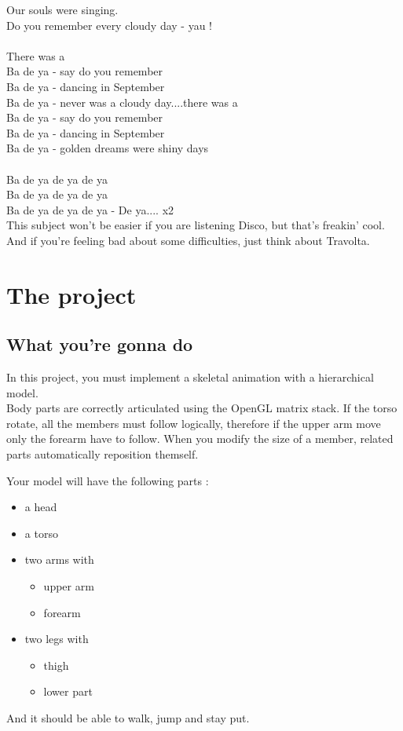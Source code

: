 \documentclass{42}
\begin{document}
{Our souls were singing.\\
Do you remember every cloudy day - yau !\\
\\
There was a\\
Ba de ya - say do you remember\\
Ba de ya - dancing in September\\
Ba de ya - never was a cloudy day....there was a\\
Ba de ya - say do you remember\\
Ba de ya - dancing in September\\
Ba de ya - golden dreams were shiny days\\
\\
Ba de ya de ya de ya\\
Ba de ya de ya de ya\\
Ba de ya de ya de ya - De ya.... {x2}\\

This subject won't be easier if you are listening Disco, but that's freakin' cool.\\
And if you're feeling bad about some difficulties, just think about Travolta.
}

\chapter{The project}
\section{What you're gonna do}

In this project, you must implement a skeletal animation with a hierarchical model.\\
Body parts are correctly articulated using the OpenGL matrix stack. If the torso rotate, all the members must follow logically, therefore if the upper arm move only the forearm have to follow. When you modify the size of a member, related parts automatically reposition themself.

Your model will have the following parts :\\
\begin{itemize}
	\item a head
	\item a torso
	\item two arms with
	\begin{itemize}
		\item upper arm
		\item forearm
	\end{itemize}
	\item two legs with
	\begin{itemize}
		\item thigh
		\item lower part
	\end{itemize}
\end{itemize}
And it should be able to walk, jump and stay put.
\end{document}
